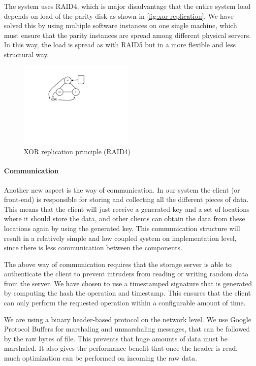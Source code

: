 \documentclass[12pt,a4paper]{scrartcl}
\begin{document}
The system uses RAID4, which is major disadvantage that the entire system load depends on load of the parity disk as shown in \autoref{fig:xor-replication}. We have solved this by using multiple software instances on one single machine, which must ensure that the parity instances are spread among different physical servers. In this way, the load is spread as with RAID5 but in a more flexible and less structural way.

\begin{figure}[H]
\centering
\includegraphics[width=0.5\textwidth,trim=4cm 8cm 8cm 1cm,clip=true]{diagrams/xor-replication.pdf}
\caption{XOR replication principle (RAID4)}
\label{fig:xor-replication}
\end{figure}

\paragraph{Communication}
Another new aspect is the way of communication. In our system the client (or front-end) is responsible for storing and collecting all the different pieces of data. This means that the client will just receive a generated key and a set of locations where it should store the data, and other clients can obtain the data from these locations again by using the generated key. This communication structure will result in a relatively simple and low coupled system on implementation level, since there is less communication between the components.

The above way of communication requires that the storage server is able to authenticate the client to prevent intruders from reading or writing random data from the server. We have chosen to use a timestamped signature that is generated by computing the hash the operation and timestamp. This ensures that the client can only perform the requested operation within a configurable amount of time.

We are using a binary header-based protocol on the network level. We use Google Protocol Buffers for marshaling and unmarshaling messages, that can be followed by the raw bytes of file. This prevents that huge amounts of data must be marshaled. It also gives the performance benefit that once the header is read, much optimization can be performed on incoming the raw data.
\end{document}
